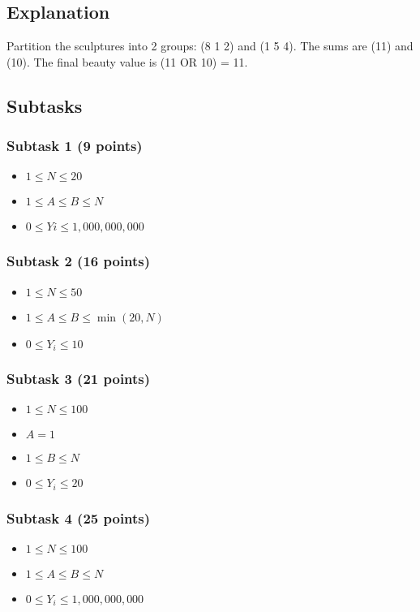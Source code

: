 \documentclass{report}
\begin{document}
\subsection*{Explanation}
Partition the sculptures into 2 groups: (8 1 2) and (1 5 4). The sums are (11) and (10). The final beauty value is (11 OR 10) = 11.

\subsection*{Subtasks}
\subsubsection{Subtask 1 (9 points)}
\begin{itemize} \itemsep1pt \parskip0pt
\item $1 \le N \le 20$
\item $1 \le A \le B \le N$
\item $0 \le Yi \le 1,000,000,000$
\end{itemize}

\subsubsection{Subtask 2 (16 points)}
\begin{itemize} \itemsep1pt \parskip0pt
\item $1 \le N \le 50$
\item $1 \le A \le B \le \min(20, N)$
\item $0 \le Y_i \le 10$
\end{itemize}

\subsubsection{Subtask 3 (21 points)}
\begin{itemize} \itemsep1pt \parskip0pt
\item $1 \le N \le 100$
\item $A = 1$
\item $1 \le B \le N$
\item $0 \le Y_i \le 20$
\end{itemize}

\subsubsection{Subtask 4 (25 points)}
\begin{itemize} \itemsep1pt \parskip0pt
\item $1 \le N \le 100$
\item $1 \le A \le B \le N$
\item $0 \le Y_i \le 1,000,000,000$
\end{itemize}
\end{document}
